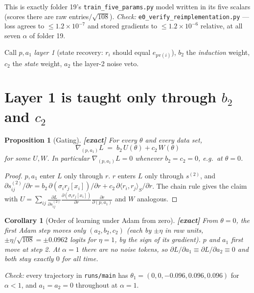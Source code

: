 \documentclass[11pt]{article}
\newtheorem{proposition}{Proposition}
\newtheorem{corollary}{Corollary}
\theoremstyle{definition}
\theoremstyle{remark}
\newcommand{\1}{\mathbf{1}}
\newcommand{\ip}[2]{\langle #1,#2\rangle_{S}}
\begin{document}
This is exactly folder 19's \texttt{train\_five\_params.py} model written in its five scalars
(scores there are raw entries$/\sqrt{108}$). \emph{Check:} \texttt{e0\_verify\_reimplementation.py}
--- loss agrees to $\le 1.2\times10^{-7}$ and stored gradients to $\le1.2\times10^{-6}$ relative,
at all seven $\alpha$ of folder 19.

Call $p,a_1$ \emph{layer 1} (state recovery: $r_i$ should equal $e_{\mathrm{pv}(i)}$),
$b_2$ the \emph{induction} weight, $c_2$ the \emph{state} weight, $a_2$ the layer-2 noise veto.

\section{Layer 1 is taught only through $b_2$ and $c_2$}

\begin{proposition}[Gating] \textbf{[exact]}
For every $\theta$ and every data set,
\[
\nabla_{(p,a_1)} L \;=\; b_2\, U(\theta) + c_2\, W(\theta)
\]
for some $U,W$. In particular $\nabla_{(p,a_1)}L=0$ whenever $b_2=c_2=0$, e.g.\ at $\theta=0$.
\end{proposition}
\begin{proof}
$p,a_1$ enter $L$ only through $r$. $r$ enters $L$ only through $s^{(2)}$, and
$\partial s^{(2)}_{ij}/\partial r = b_2\,\partial(\sigma_i r_j[x_i])/\partial r + c_2\,\partial\ip{r_i}{r_j}/\partial r$.
The chain rule gives the claim with
$U=\sum_{ij}\frac{\partial L}{\partial s^{(2)}_{ij}}\frac{\partial(\sigma_i r_j[x_i])}{\partial r}\frac{\partial r}{\partial(p,a_1)}$
and $W$ analogous.
\end{proof}

\begin{corollary}[Order of learning under Adam from zero] \textbf{[exact]}
From $\theta=0$, the first Adam step moves only $(a_2,b_2,c_2)$ (each by $\pm\eta$ in raw units,
$\pm\eta/\sqrt{108}=\pm0.0962$ logits for $\eta=1$, by the sign of its gradient). $p$ and $a_1$
first move at step 2. At $\alpha=1$ there are no noise tokens, so $\partial L/\partial a_1\equiv
\partial L/\partial a_2\equiv0$ and both stay exactly $0$ for all time.
\end{corollary}
\emph{Check:} every trajectory in \texttt{runs/main} has $\theta_1=(0,0,-0.096,0.096,0.096)$
for $\alpha<1$, and $a_1=a_2=0$ throughout at $\alpha=1$.
\end{document}
